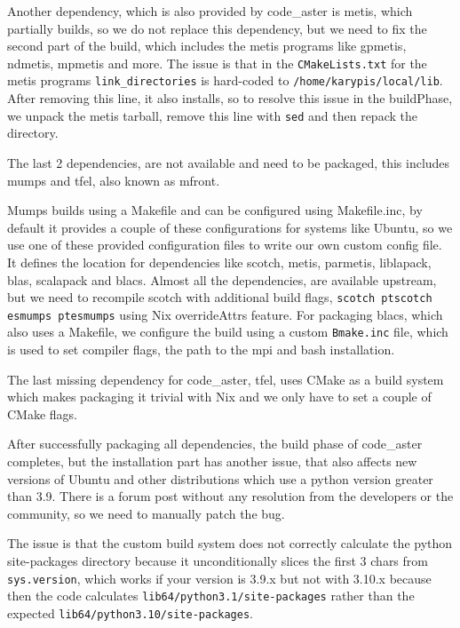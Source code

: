 \documentclass{eceasst}
\begin{document}
Another dependency, which is also provided by code\_aster is metis, which partially builds, so we do not replace this dependency, but we need to fix the second part of the build, which includes the metis programs like gpmetis, ndmetis, mpmetis and more.
The issue is that in the \texttt{CMakeLists.txt} for the metis programs \texttt{link\_directories} is hard-coded to \texttt{/home/karypis/local/lib}.
After removing this line, it also installs, so to resolve this issue in the buildPhase, we unpack the metis tarball, remove this line with \texttt{sed} and then repack the directory.

The last 2 dependencies, are not available and need to be packaged, this includes mumps and tfel, also known as mfront.

Mumps builds using a Makefile and can be configured using Makefile.inc, by default it provides a couple of these configurations for systems like Ubuntu, so we use one of these provided configuration files to write our own custom config file.
It defines the location for dependencies like scotch, metis, parmetis, liblapack, blas, scalapack and blacs.
Almost all the dependencies, are available upstream, but we need to recompile scotch with additional build flags, \texttt{scotch ptscotch esmumps ptesmumps} using Nix overrideAttrs feature.
For packaging blacs, which also uses a Makefile, we configure the build using a custom \texttt{Bmake.inc} file, which is used to set compiler flags, the path to the mpi and bash installation.

The last missing dependency for code\_aster, tfel, uses CMake as a build system which makes packaging it trivial with Nix and we only have to set a couple of CMake flags.

After successfully packaging all dependencies, the build phase of code\_aster completes, but the installation part has another issue, that also affects new versions of Ubuntu and other distributions which use a python version greater than 3.9.
There is a forum post without any resolution from the developers or the community, so we need to manually patch the bug.

The issue is that the custom build system does not correctly calculate the python site-packages directory because it unconditionally slices the first 3 chars from \texttt{sys.version}, which works if your version is 3.9.x but not with 3.10.x because then the code calculates \texttt{lib64/python3.1/site-packages} rather than the expected \texttt{lib64/python3.10/site-packages}.
\end{document}
